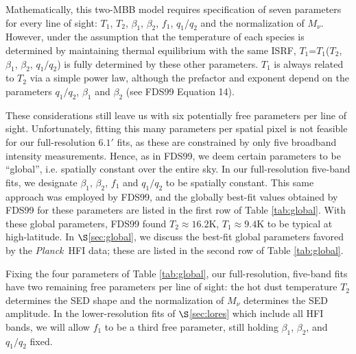 \documentclass{emulateapj}
\newcommand{\PLANCK}{{\it Planck}}
\begin{document}
Mathematically, this two-MBB model requires specification of seven 
parameters for every line of sight: $T_1$, $T_2$, $\beta_1$, $\beta_2$, $f_1$, 
$q_1$/$q_2$ and the normalization of $M_{\nu}$. However, under the 
assumption that the temperature of each species is determined by maintaining 
thermal equilibrium with the same ISRF, $T_1$=$T_1$($T_2$, $\beta_1$, 
$\beta_2$, $q_1/q_2$) is fully determined by these other parameters. $T_1$ is 
always related to $T_2$ via a simple power law, although the prefactor and 
exponent depend on the parameters $q_1/q_2$, $\beta_1$ and $\beta_2$ (see FDS99
Equation 14).


These considerations still leave us with six potentially free parameters per 
line of sight. Unfortunately, fitting this many parameters per spatial pixel is
not feasible for our full-resolution $6.1$$'$ fits, as these are constrained by
only five broadband intensity measurements. Hence, as in FDS99, we deem certain
 parameters to be ``global'', i.e. spatially constant over the entire sky. In 
our full-resolution five-band fits, we designate $\beta_1$, $\beta_2$, $f_1$ 
and $q_1/q_2$ to be spatially constant. This same approach was employed by 
FDS99, and the globally best-fit values obtained by FDS99 for these parameters 
are listed in the first row of Table \ref{tab:global}. With these global 
parameters, FDS99 found $T_2$$\approx$$16.2$K, $T_1$$\approx$$9.4$K to be 
typical at high-latitude. In $\S$\ref{sec:global}, we discuss the best-fit 
global parameters favored by the \PLANCK~HFI data; these are listed in the 
second row of Table \ref{tab:global}.

Fixing the four parameters of Table \ref{tab:global}, our full-resolution, 
five-band fits have two remaining free parameters per line of sight: the hot 
dust temperature $T_2$ determines the SED shape and the normalization of 
$M_{\nu}$ determines the SED amplitude. In the lower-resolution fits of 
$\S$\ref{sec:lores} which include all HFI bands, we will allow $f_1$ to be a 
third free parameter, still holding $\beta_1$, $\beta_2$, and $q_1/q_2$ fixed.


% 

\end{document}
